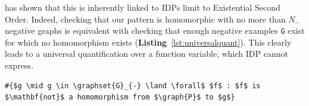
\citep{conf/fsttcs/Immerman98} has shown that this is inherently linked to IDPs limit to Existential Second Order.
Indeed, checking that our pattern  is homomorphic with no more than $N_{-}$ negative graphs is equivalent with checking that enough negative examples \lstinline{G} exist for which  no homomorphism exists (\textbf{Listing}~\ref{lst:universalquant}). This clearly leads to a universal quantification over a function variable, which IDP cannot express.

\vspace{-1.25em}
\begin{center}
\begin{minipage}{0.75\linewidth}
\begin{lstlisting}[style=small,mathescape, caption=Quantifying over functions outside the vocabulary, label=lst:universalquant]
#{$g \mid g \in \graphset{G}_{-} \land \forall$ $f$ : $f$ is $\mathbf{not}$ a homomorphism from $\graph{P}$ to $g$}
\end{lstlisting}
\end{minipage}
\end{center}
\vspace{-0.5em}

